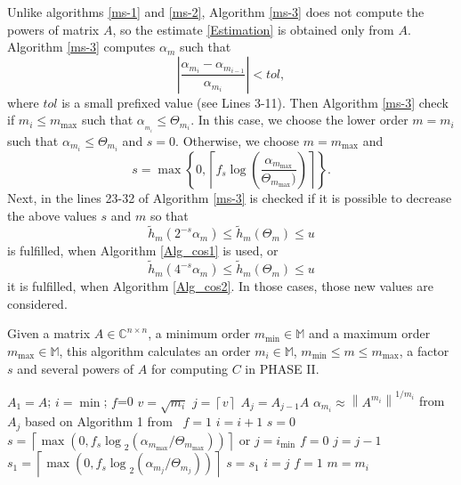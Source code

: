 Unlike algorithms \ref{ms-1} and \ref{ms-2}, Algorithm \ref{ms-3} does not compute the powers of matrix $A$, so the estimate \eqref{Estimation} is obtained only from $A$. Algorithm \ref{ms-3} computes $\alpha_m$ such that
\[\left| {\frac{{\alpha_{m_{i}} - \alpha_{m_{i-1}}}}{{\alpha_{m_{i}}}}} \right| < tol,\]
where $tol$ is a small prefixed value (see Lines 3-11).
Then Algorithm \ref{ms-3} check if  $ m_{i}\le m_{\max}$ such that $\alpha_{_{m_{i}}} \leq \Theta_{m_{i}}$. In this case,  we choose the lower
order $m=m_i$ such that $\alpha_{m_{i}} \leq \Theta_{m_{i}}$ and  $s=0$.
Otherwise, we choose $m=m_{\max}$ and
\begin{equation*}
s = \max \left\{ {0,\left\lceil f_s\log \left(
{\frac{{{\alpha_{m_{\max}}}}}{{\Theta_{m_{\max}}})}} \right)
\right\rceil } \right\}.
\end{equation*} 
Next, in the lines 23-32 of Algorithm \ref{ms-3}  is checked if it is possible to decrease the above values $s$ and $m$ so that
\[{\tilde h_m}(2^{-s}\alpha _m) \leqslant {\tilde h_m}({\Theta _m}) \leqslant u \]
is fulfilled, when Algorithm \ref{Alg_cos1} is used, or \[{\tilde h_m}(4^{-s}\alpha _m) \leqslant {\tilde h_m}({\Theta _m}) \leqslant u\]
 it is fulfilled, when Algorithm \ref{Alg_cos2}.
In those cases, those new values are considered.

  \begin{algorithm}[!ht]
\caption{Given a matrix $A \in {\mathbb{C}^{n \times n}}$, a minimum order $m_{\min}\in\mathbb{M}$ and a maximum order $m_{\max}\in\mathbb{M}$, this algorithm calculates an order $m_i\in\mathbb{M}$, $m_{\min}\le m\le m_{\max}$, a factor $s$ and several powers of $A$ for computing $C$ in PHASE II.}
\label{ms-1}
\begin{algorithmic} [1]
\State $A_1=A$; $i=\min$; $f$=0
    \State $v=\sqrt {m_{i}}$
    \State $j=\left\lceil v\right\rceil$
        \State $A_j=A_{j-1}A$ 
    \EndIf
    \State ${\alpha_{m_{i}}} \approx {\left\| {{A^{m_i}}} \right\|^{1/m_i}}$ from $A_j$  \Comment based on Algorithm 1  from~\cite{High88} 
        \State $f=1$
    \Else
         \State $i=i+1$
    \EndIf 
\EndWhile
{}
    \State $s=0$
\Else
    \State $s = \left\lceil {\max \left( {0,{{f_{s}\log }_2}({\alpha_{m_{\max}}}/{\Theta_{m_{\max}}})} \right)} \right\rceil $ or  
    \State $j=i_{\min}$
    \State $f=0$
       \State $j=j-1$
       \State $s_1 = \left\lceil {\max \left( {0,{{f_{s}\log }_2}({\alpha_{m_{j}}}/{\Theta_{m_{j}}})} \right)} \right\rceil $
            \State $s=s_1$
            \State $i=j$
       \Else 
            \State $f=1$  
       \EndIf 
    \EndWhile   
\EndIf
\State $m=m_i$    
\end{algorithmic}
\end{algorithm}

